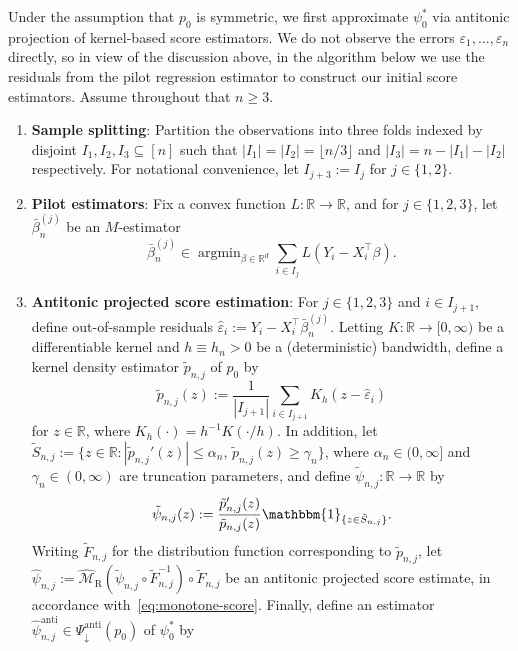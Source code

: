 \documentclass[a4paper]{article}
\newcommand{\R}{\mathbb{R}}
\newcommand{\Ind}{\mathbbm{1}}
\newcommand{\floor}[1]{\lfloor #1 \rfloor}
\DeclareMathOperator*{\argmin}{argmin}
\theoremstyle{definition}
\begin{document}
Under the assumption that $p_0$ is symmetric, we first approximate $\psi_0^*$ via antitonic projection of kernel-based score estimators. We do not observe the errors $\varepsilon_1,\ldots,\varepsilon_n$ directly, so in view of the discussion above, in the algorithm below we use the residuals from the pilot regression estimator to construct our initial score estimators. Assume throughout that $n \geq 3$.

\begin{enumerate}[leftmargin=0.45cm]
\item \textbf{Sample splitting}: Partition the observations into three folds indexed by disjoint $I_1,I_2,I_3 \subseteq [n]$ such that $|I_1| = |I_2| = \floor{n/3}$ and $|I_3| = n - |I_1| - |I_2|$ respectively. For notational convenience, let $I_{j+3} := I_j$ for $j \in \{1,2\}$.
\item \textbf{Pilot estimators}: Fix a convex function $L \colon \R \to \R$, and for $j \in \{1,2,3\}$, let $\bar{\beta}_n^{(j)}$ be an $M$-estimator
\begin{equation}
\label{eq:pilot-est}
\bar{\beta}_n^{(j)} \in \argmin_{\beta \in \R^d} \sum_{i \in I_j} L(Y_i - X_i^\top\beta).
\end{equation}
\item \textbf{Antitonic projected score estimation}: For $j \in \{1,2,3\}$ and $i \in I_{j+1}$, define out-of-sample residuals $\hat{\varepsilon}_i := Y_i - X_i^\top\bar{\beta}_n^{(j)}$. Letting $K \colon \R \to [0,\infty)$ be a differentiable kernel and $h \equiv h_n > 0$ be a (deterministic) bandwidth, define a kernel density estimator $\tilde{p}_{n,j}$ of $p_0$ by
\[
\tilde{p}_{n,j}(z) := \frac{1}{|I_{j+1}|}\sum_{i \in I_{j+1}} K_h(z - \hat{\varepsilon}_i)
\]
for $z \in \R$, where $K_h(\cdot) = h^{-1}K(\cdot/h)$. In addition, let $\tilde{S}_{n,j} := \bigl\{z \in \R : |\tilde{p}_{n,j}'(z)| \leq \alpha_n,\, \tilde{p}_{n,j}(z) \geq \gamma_n\bigr\}$, where $\alpha_n \in (0,\infty]$ and $\gamma_n \in (0,\infty)$ are truncation parameters, and define $\tilde{\psi}_{n,j} \colon \R \to \R$ by
\begin{equation}
\label{eq:psi-kernel}
\tilde{\psi}_{n,j}(z) := \frac{\tilde{p}_{n,j}'(z)}{\tilde{p}_{n,j}(z)}\Ind_{\{z \in \tilde{S}_{n,j}\}}.
\end{equation}
Writing $\tilde{F}_{n,j}$ for the distribution function corresponding to $\tilde{p}_{n,j}$, let $\hat{\psi}_{n,j} := \widehat{\mathcal{M}}_\mathrm{R}(\tilde{\psi}_{n,j} \circ \tilde{F}_{n,j}^{-1}) \circ \tilde{F}_{n,j}$ be an antitonic projected score estimate, in accordance with~\eqref{eq:monotone-score}. Finally, define an estimator $\hat{\psi}_{n,j}^{\mathrm{anti}} \in \Psi_\downarrow^{\mathrm{anti}}(p_0)$ of $\psi_0^*$ by

\end{enumerate}
\end{document}
